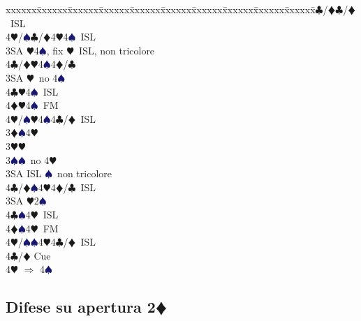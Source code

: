\documentclass[a4paper,italian]{article}
\newcommand{\BC}{\textcolor{OliveGreen}{$\clubsuit$}}
\newcommand{\BD}{\textcolor{RedOrange}{$\vardiamondsuit$}}
\newcommand{\BH}{\textcolor{Red2}{$\varheartsuit${}}}
\newcommand{\BS}{\textcolor{MidnightBlue}{$\spadesuit${}}}
\newcommand{\pdfd}{\texorpdfstring{\BD{}}{D}}
\newenvironment{bidtable}
{\begin{tabbing}

    xxxxxx\=xxxxxx\=xxxxxx\=xxxxxx\=xxxxxx\=xxxxxx\=xxxxxx\=xxxxxx\=xxxxxx\=xxxxxx\=\kill}
{\end{tabbing} }%
\begin{document}
\begin{multicols}{2}
\begin{bidtable}
        4\BC/\BD {}\BC /\BD\ ISL\\
        4\BH/\BS {}\BC /\BD 4\BH 4\BS\ ISL\-\-\\
        3SA \BH 4\BS , fix \BH\ ISL, non tricolore\\
        4\BC/\BD {}\BH 4\BS 4\BD /\BC \-\\
        3SA \BH\ no 4\BS \+\\
        4\BC {}\BH 4\BS\ ISL\\
        4\BD {}\BH 4\BS\ FM\\
        4\BH/\BS {}\BH4\BS4\BC/\BD\ ISL\-\-\\
        3\BD {}\BS 4\BH \+\\
        3\BH {}\BH \\
        3\BS {}\BS\ no 4\BH \+\\
        3SA\> ISL \BS\ non tricolore\\
        4\BC/\BD {}\BS 4\BH 4\BD /\BC\ ISL\-\\
        3SA \BH 2\BS \+\\
        4\BC {}\BS 4\BH\ ISL\\
        4\BD {}\BS 4\BH\ FM\\
        4\BH/\BS {}\BS 4\BH 4\BC /\BD\ ISL \-\\
        4\BC/\BD \> Cue\+\\
        4\BH \> $\Rightarrow$ 4\BS

    \end{bidtable}
\end{multicols}

\subsection{Difese su apertura 2\pdfd}
\end{document}
